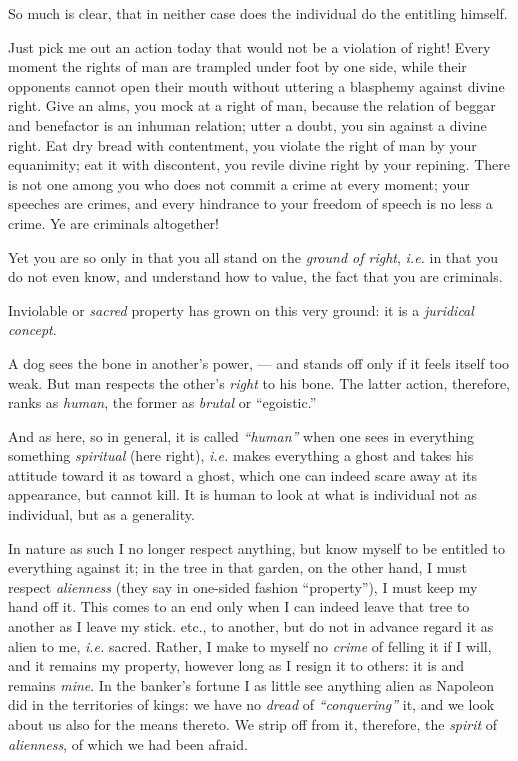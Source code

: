 So much is clear, that in neither case does the individual do the entitling 
himself.

Just pick me out an action today that would not be a violation of right! Every 
moment the rights of man are trampled under foot by one side, while their 
opponents cannot open their mouth without uttering a blasphemy against divine 
right. Give an alms, you mock at a right of man, because the relation of 
beggar and benefactor is an inhuman relation; utter a doubt, you sin against a 
divine right. Eat dry bread with contentment, you violate the right of man by 
your equanimity; eat it with discontent, you revile divine right by your 
repining. There is not one among you who does not commit a crime at every 
moment; your speeches are crimes, and every hindrance to your freedom of 
speech is no less a crime. Ye are criminals altogether!

Yet you are so only in that you all stand on the \textit{ground of right}, 
\textit{i.e.} in that you do not even know, and understand how to value, the 
fact that you are criminals.

Inviolable or \textit{sacred} property has grown on this very ground: it is a 
\textit{juridical concept}.

A dog sees the bone in another's power, --- and stands off only if it feels 
itself too weak. But man respects the other's \textit{right} to his bone. The 
latter action, therefore, ranks as \textit{human}, the former as 
\textit{brutal} or ``egoistic.''

And as here, so in general, it is called \textit{``human''} when one sees in 
everything something \textit{spiritual} (here right), \textit{i.e.} makes 
everything a ghost and takes his attitude toward it as toward a ghost, which 
one can indeed scare away at its appearance, but cannot kill. It is human to 
look at what is individual not as individual, but as a generality.

In nature as such I no longer respect anything, but know myself to be entitled 
to everything against it; in the tree in that garden, on the other hand, I 
must respect \textit{alienness} (they say in one-sided fashion 
``property''), I must keep my hand off it. This comes to an end only when I 
can indeed leave that tree to another as I leave my stick. etc., to another, 
but do not in advance regard it as alien to me, \textit{i.e.} sacred. Rather, 
I make to myself no \textit{crime} of felling it if I will, and it remains my 
property, however long as I resign it to others: it is and remains 
\textit{mine}. In the banker's fortune I as little see anything alien as 
Napoleon did in the territories of kings: we have no \textit{dread} of 
\textit{``conquering''} it, and we look about us also for the means thereto. 
We strip off from it, therefore, the \textit{spirit} of \textit{alienness}, of 
which we had been afraid.

